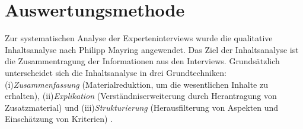 
\section{Auswertungsmethode}
Zur systematischen Analyse der Experteninterviews wurde die qualitative Inhaltsanalyse nach Philipp Mayring angewendet. Das Ziel der Inhaltsanalyse ist die Zusammentragung der Informationen aus den Interviews. Grundsätzlich unterscheidet sich die Inhaltsanalyse in drei Grundtechniken: (i)\emph{Zusammenfassung} (Materialreduktion, um die wesentlichen Inhalte zu erhalten), (ii)\emph{Explikation} (Verständniserweiterung durch Herantragung von Zusatzmaterial) und (iii)\emph{Strukturierung} (Herausfilterung von Aspekten und Einschätzung von Kriterien) \cite{mayring1994qualitative}.\\

